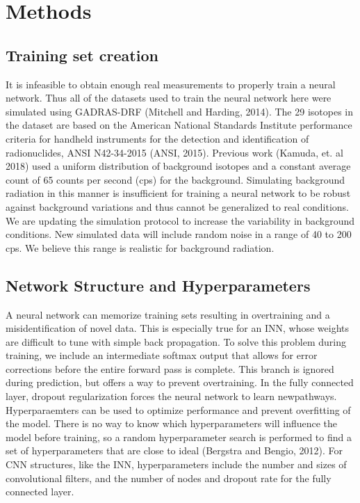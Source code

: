 \documentclass{anstrans}
\begin{document}
\section{Methods}
\subsection{Training set creation}
It is infeasible to obtain enough real measurements to properly train a neural network. 
Thus all of the datasets used to train the neural network here were simulated using GADRAS-DRF (Mitchell and Harding, 2014). 
The 29 isotopes in the dataset are based on the American National Standards Institute performance criteria for handheld instruments for the detection and identification of radionuclides, ANSI N42-34-2015 (ANSI, 2015). 
Previous work (Kamuda, et. al 2018) used a uniform distribution of background isotopes and a constant average count of 65 counts per second (cps) for the background. 
Simulating background radiation in this manner is insufficient for training a neural network to be robust against background variations and thus cannot be generalized to real conditions. 
We are updating the simulation protocol to increase the variability in background conditions. New simulated data will include random noise in a range of 40 to 200 cps. 
We believe this range is realistic for background radiation.
\subsection{Network Structure and Hyperparameters}
A neural network can memorize training sets resulting in overtraining and a misidentification of novel data. 
This is especially true for an INN, whose weights are difficult to tune with simple back propagation.
To solve this problem during training, we include an intermediate softmax output that allows for error corrections before the entire forward pass is complete. 
This branch is ignored during prediction, but offers a way to prevent overtraining. 
In the fully connected layer, dropout regularization forces the neural network to learn newpathways. 
Hyperparaemters can be used to optimize performance and prevent overfitting of the model.
There is no way to know which hyperparameters will influence the model before training, so a random hyperparameter search is performed to find a set of hyperparameters that are close to ideal (Bergstra and Bengio, 2012). 
For CNN structures, like the INN, hyperparameters include the number and sizes of convolutional filters, and the number of nodes and dropout rate for the fully connected layer. 
\end{document}

